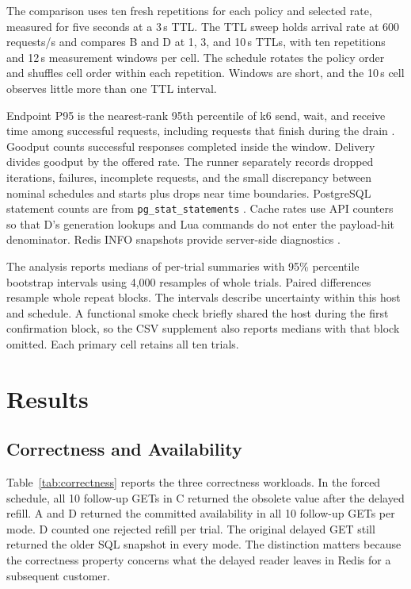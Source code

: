 \documentclass[conference]{IEEEtran}
\begin{document}
The comparison uses ten fresh repetitions for each policy and selected rate, measured for five seconds at a 3\,s TTL. The TTL sweep holds arrival rate at 600 requests/s and compares B and D at 1, 3, and 10\,s TTLs, with ten repetitions and 12\,s measurement windows per cell. The schedule rotates the policy order and shuffles cell order within each repetition. Windows are short, and the 10\,s cell observes little more than one TTL interval.

Endpoint P95 is the nearest-rank 95th percentile of k6 send, wait, and receive time among successful requests, including requests that finish during the drain \cite{k6metrics}. Goodput counts successful responses completed inside the window. Delivery divides goodput by the offered rate. The runner separately records dropped iterations, failures, incomplete requests, and the small discrepancy between nominal schedules and starts plus drops near time boundaries. PostgreSQL statement counts are from \texttt{pg\_stat\_statements} \cite{pgstats}. Cache rates use API counters so that D's generation lookups and Lua commands do not enter the payload-hit denominator. Redis INFO snapshots provide server-side diagnostics \cite{redisinfo}.

The analysis reports medians of per-trial summaries with 95\% percentile bootstrap intervals using 4{,}000 resamples of whole trials. Paired differences resample whole repeat blocks. The intervals describe uncertainty within this host and schedule. A functional smoke check briefly shared the host during the first confirmation block, so the CSV supplement also reports medians with that block omitted. Each primary cell retains all ten trials.

\section{Results}

\subsection{Correctness and Availability}

Table~\ref{tab:correctness} reports the three correctness workloads. In the forced schedule, all 10 follow-up GETs in C returned the obsolete value after the delayed refill. A and D returned the committed availability in all 10 follow-up GETs per mode. D counted one rejected refill per trial. The original delayed GET still returned the older SQL snapshot in every mode. The distinction matters because the correctness property concerns what the delayed reader leaves in Redis for a subsequent customer.
\end{document}
